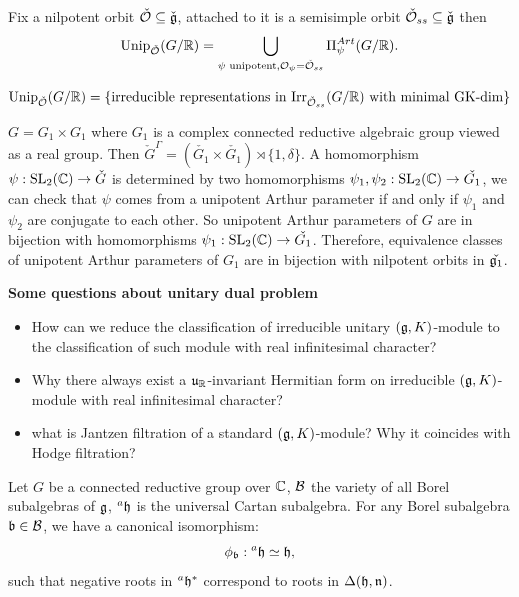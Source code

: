 \begin{cor}
  Fix a nilpotent orbit $\check{\mathcal{O}} \subseteq \check{\mathfrak{g}}$, attached to it is a semisimple orbit $\check{\mathcal{O}}_{ss} \subseteq \check{\mathfrak{g}}$ then
  \[
    \mathrm{Unip}_{\check{\mathcal{O}}}(G/\mathbb{R}) = \bigcup_{\psi \textrm{ unipotent}, \mathcal{O}_{\psi} = \check{\mathcal{O}}_{ss}} \Pi_{\psi}^{Art}(G/\mathbb{R}).
  \]
\end{cor}

\begin{rk}
  \[\mathrm{Unip}_{\check{\mathcal{O}}}(G/\mathbb{R}) = \{ \text{irreducible representations in $\operatorname{Irr}_{\check{\mathcal{O}}_{ss}}( G/\mathbb{R})$ with minimal GK-dim} \}\]
\end{rk}

\begin{examp}
  $G = G_1 \times G_1$ where $G_1$ is a complex connected reductive algebraic group viewed as a real group. Then $\check{G}^{\Gamma} = (\check{G_1} \times \check{G_1}) \rtimes \{1,\delta\}$. A homomorphism $\psi : \operatorname{SL}_2(\mathbb{C}) \to \check{G}$ is determined by two homomorphisms $\psi_1, \psi_2 : \operatorname{SL}_2(\mathbb{C}) \to \check{G_1}$, we can check that $\psi$ comes from a unipotent Arthur parameter if and only if $\psi_1$ and $\psi_2$ are conjugate to each other. So unipotent Arthur parameters of $G$ are in bijection with homomorphisms $\psi_1 : \operatorname{SL}_2(\mathbb{C}) \to \check{G_1}$. Therefore, equivalence classes of unipotent Arthur parameters of $G_1$ are in bijection with nilpotent orbits in $\check{\mathfrak{g}_1}$.
\end{examp}





\textbf{Some questions about unitary dual problem}

\begin{itemize}
  \item How can we reduce the classification of irreducible unitary $(\mathfrak{g},K)$-module to the classification of such module with real infinitesimal character?
  \item Why there always exist a $\mathfrak{u}_{\mathbb{R}}$-invariant Hermitian form on irreducible $(\mathfrak{g},K)$-module with real infinitesimal character?
  \item what is Jantzen filtration of a standard $(\mathfrak{g},K)$-module? Why it coincides with Hodge filtration?
\end{itemize}


Let $G$ be a connected reductive group over $\mathbb{C}$, $\mathcal{B}$ the variety of all Borel subalgebras of $\mathfrak{g}$, $^{a}\mathfrak{h}$ is the universal Cartan subalgebra. For any Borel subalgebra $\mathfrak{b} \in \mathcal{B}$, we have a canonical isomorphism:
\[\phi_{\mathfrak{b}} : {^{a}\mathfrak{h}} \simeq \mathfrak{h},\]
such that negative roots in $^{a}\mathfrak{h}^*$ correspond to roots in $\Delta(\mathfrak{h},\mathfrak{n})$.

